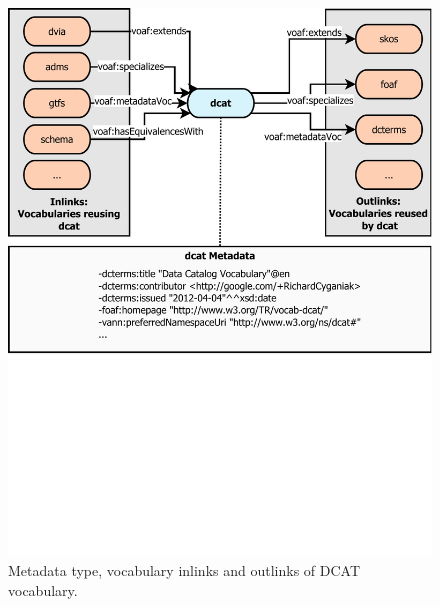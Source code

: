 \documentclass{iosart2c}
\begin{document}
\begin{figure}[ht!b]
\includegraphics[trim={0cm 10cm 0cm 0cm},width=1\textwidth]{FlowCharts/DCAT.pdf}
\caption{Metadata type, vocabulary inlinks and outlinks of DCAT vocabulary.}
\label{fig:dcat}
\end{figure}
\end{document}
